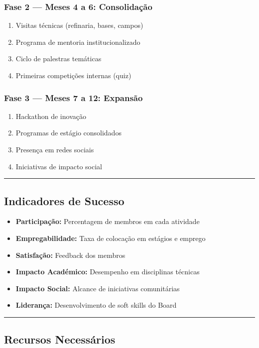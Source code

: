 \documentclass[12pt,a4paper]{article}
\newcommand{\proposalsep}{%
  \vspace{6pt}%
  {\color{gold}\rule{0.35\linewidth}{0.7pt}}%
  \vspace{4pt}%
}
\begin{document}
\subsubsection*{Fase 2 — Meses 4 a 6: Consolidação}
\begin{enumerate}
    \item Visitas técnicas (refinaria, bases, campos)
    \item Programa de mentoria institucionalizado
    \item Ciclo de palestras temáticas
    \item Primeiras competições internas (quiz)
\end{enumerate}

\subsubsection*{Fase 3 — Meses 7 a 12: Expansão}
\begin{enumerate}
    \item Hackathon de inovação
    \item Programas de estágio consolidados
    \item Presença em redes sociais
    \item Iniciativas de impacto social
\end{enumerate}

\proposalsep

\subsection{Indicadores de Sucesso}

\begin{itemize}
    \item \textbf{Participação:} Percentagem de membros em cada atividade
    \item \textbf{Empregabilidade:} Taxa de colocação em estágios e emprego
    \item \textbf{Satisfação:} Feedback dos membros
    \item \textbf{Impacto Académico:} Desempenho em disciplinas técnicas
    \item \textbf{Impacto Social:} Alcance de iniciativas comunitárias
    \item \textbf{Liderança:} Desenvolvimento de soft skills do Board
\end{itemize}

\proposalsep

\subsection{Recursos Necessários}
\end{document}

